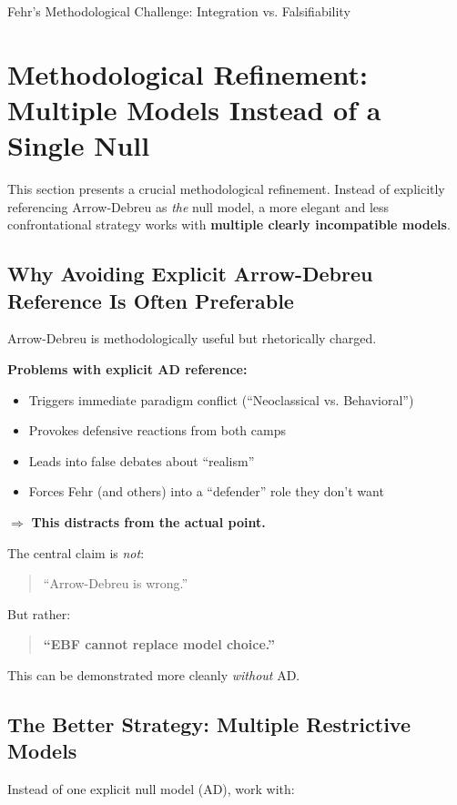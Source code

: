 \begin{chapter}{Fehr's Methodological Challenge: Integration vs. Falsifiability}
\section{Methodological Refinement: Multiple Models Instead of a Single Null}
\label{sec:multiple-models}

This section presents a crucial methodological refinement. Instead of explicitly referencing
Arrow-Debreu as \textit{the} null model, a more elegant and less confrontational strategy
works with \textbf{multiple clearly incompatible models}.

\subsection{Why Avoiding Explicit Arrow-Debreu Reference Is Often Preferable}

Arrow-Debreu is methodologically useful but rhetorically charged.

\textbf{Problems with explicit AD reference:}
\begin{itemize}[noitemsep]
    \item Triggers immediate paradigm conflict (``Neoclassical vs. Behavioral'')
    \item Provokes defensive reactions from both camps
    \item Leads into false debates about ``realism''
    \item Forces Fehr (and others) into a ``defender'' role they don't want
\end{itemize}

$\Rightarrow$ \textbf{This distracts from the actual point.}

The central claim is \textit{not}:

\begin{quote}
``Arrow-Debreu is wrong.''
\end{quote}

But rather:

\begin{quote}
\textbf{``EBF cannot replace model choice.''}
\end{quote}

This can be demonstrated more cleanly \textit{without} AD.

\subsection{The Better Strategy: Multiple Restrictive Models}

Instead of one explicit null model (AD), work with:


\end{chapter}
